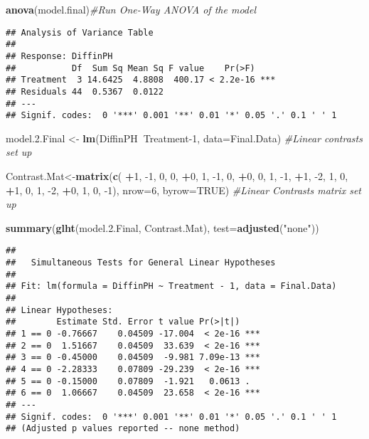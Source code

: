 \documentclass[12pt,]{article}
\newenvironment{Shaded}{\begin{snugshade}}{\end{snugshade}}
\newcommand{\CommentTok}[1]{\textcolor[rgb]{0.56,0.35,0.01}{\textit{#1}}}
\newcommand{\DataTypeTok}[1]{\textcolor[rgb]{0.13,0.29,0.53}{#1}}
\newcommand{\DecValTok}[1]{\textcolor[rgb]{0.00,0.00,0.81}{#1}}
\newcommand{\FloatTok}[1]{\textcolor[rgb]{0.00,0.00,0.81}{#1}}
\newcommand{\KeywordTok}[1]{\textcolor[rgb]{0.13,0.29,0.53}{\textbf{#1}}}
\newcommand{\NormalTok}[1]{#1}
\newcommand{\OperatorTok}[1]{\textcolor[rgb]{0.81,0.36,0.00}{\textbf{#1}}}
\newcommand{\OtherTok}[1]{\textcolor[rgb]{0.56,0.35,0.01}{#1}}
\newcommand{\StringTok}[1]{\textcolor[rgb]{0.31,0.60,0.02}{#1}}
\begin{document}
\begin{Shaded}
\begin{Highlighting}[]
\KeywordTok{anova}\NormalTok{(model.final)}\CommentTok{#Run One-Way ANOVA of the model}
\end{Highlighting}
\end{Shaded}

\begin{verbatim}
## Analysis of Variance Table
## 
## Response: DiffinPH
##           Df  Sum Sq Mean Sq F value    Pr(>F)    
## Treatment  3 14.6425  4.8808  400.17 < 2.2e-16 ***
## Residuals 44  0.5367  0.0122                      
## ---
## Signif. codes:  0 '***' 0.001 '**' 0.01 '*' 0.05 '.' 0.1 ' ' 1
\end{verbatim}

\begin{Shaded}
\begin{Highlighting}[]
\NormalTok{model.}\FloatTok{2.}\NormalTok{Final <-}\StringTok{ }\KeywordTok{lm}\NormalTok{(DiffinPH}\OperatorTok{~}\NormalTok{Treatment}\DecValTok{-1}\NormalTok{, }\DataTypeTok{data=}\NormalTok{Final.Data) }\CommentTok{#Linear contrasts set up}

\NormalTok{Contrast.Mat<-}\KeywordTok{matrix}\NormalTok{(}\KeywordTok{c}\NormalTok{(}
  \OperatorTok{+}\DecValTok{1}\NormalTok{, }\DecValTok{-1}\NormalTok{, }\DecValTok{0}\NormalTok{, }\DecValTok{0}\NormalTok{,}
  \OperatorTok{+}\DecValTok{0}\NormalTok{, }\DecValTok{1}\NormalTok{, }\DecValTok{-1}\NormalTok{, }\DecValTok{0}\NormalTok{,}
  \OperatorTok{+}\DecValTok{0}\NormalTok{, }\DecValTok{0}\NormalTok{, }\DecValTok{1}\NormalTok{, }\DecValTok{-1}\NormalTok{, }
  \OperatorTok{+}\DecValTok{1}\NormalTok{, }\DecValTok{-2}\NormalTok{, }\DecValTok{1}\NormalTok{, }\DecValTok{0}\NormalTok{, }
  \OperatorTok{+}\DecValTok{1}\NormalTok{, }\DecValTok{0}\NormalTok{, }\DecValTok{1}\NormalTok{, }\DecValTok{-2}\NormalTok{, }
  \OperatorTok{+}\DecValTok{0}\NormalTok{, }\DecValTok{1}\NormalTok{, }\DecValTok{0}\NormalTok{, }\DecValTok{-1}\NormalTok{), }\DataTypeTok{nrow=}\DecValTok{6}\NormalTok{, }\DataTypeTok{byrow=}\OtherTok{TRUE}\NormalTok{)}
\CommentTok{#Linear Contrasts matrix set up}

\KeywordTok{summary}\NormalTok{(}\KeywordTok{glht}\NormalTok{(model.}\FloatTok{2.}\NormalTok{Final, Contrast.Mat), }\DataTypeTok{test=}\KeywordTok{adjusted}\NormalTok{(}\StringTok{"none"}\NormalTok{))}
\end{Highlighting}
\end{Shaded}

\begin{verbatim}
## 
##   Simultaneous Tests for General Linear Hypotheses
## 
## Fit: lm(formula = DiffinPH ~ Treatment - 1, data = Final.Data)
## 
## Linear Hypotheses:
##        Estimate Std. Error t value Pr(>|t|)    
## 1 == 0 -0.76667    0.04509 -17.004  < 2e-16 ***
## 2 == 0  1.51667    0.04509  33.639  < 2e-16 ***
## 3 == 0 -0.45000    0.04509  -9.981 7.09e-13 ***
## 4 == 0 -2.28333    0.07809 -29.239  < 2e-16 ***
## 5 == 0 -0.15000    0.07809  -1.921   0.0613 .  
## 6 == 0  1.06667    0.04509  23.658  < 2e-16 ***
## ---
## Signif. codes:  0 '***' 0.001 '**' 0.01 '*' 0.05 '.' 0.1 ' ' 1
## (Adjusted p values reported -- none method)
\end{verbatim}
\end{document}
